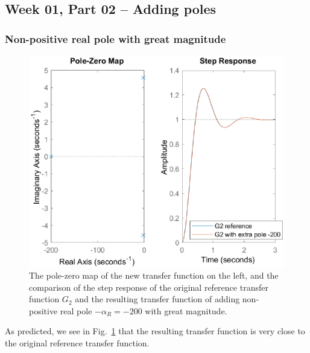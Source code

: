 \documentclass[12pt]{article}
\begin{document}
\subsection{Week 01, Part 02 -- Adding poles}

\subsubsection{Non-positive real pole with great magnitude}

\begin{figure}
    \centering
    \includegraphics{img/part02_nonpositive_real_pole.eps}
    \caption{The pole-zero map of the new transfer function on the left, and the comparison of the step response of the original reference transfer function $G_2$ and the resulting transfer function of adding non-positive real pole $-\alpha_R = -200$ with great magnitude.}
    \label{fig:non-positive real poles}
\end{figure}

As predicted, we see in Fig.~\ref{fig:non-positive real poles} that the resulting transfer function is very close to the original reference transfer function.
\end{document}
